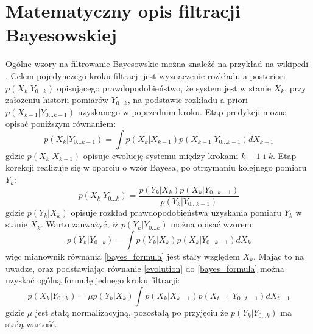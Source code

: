 \section{Matematyczny opis filtracji Bayesowskiej}
Ogólne wzory na filtrowanie Bayesowskie można znaleźć na przykład na wikipedi \cite{wiki_bayes_filter}. Celem pojedynczego kroku filtracji jest wyznaczenie rozkładu a posteriori $p(X_{k}|Y_{0...k})$ opisującego prawdopodobieństwo, że system jest w stanie $X_k$, przy założeniu historii pomiarów $Y_{0...k}$, na podstawie rozkładu a priori $p(X_{k-1}|Y_{0...k-1})$ uzyskanego w poprzednim kroku. Etap predykcji można opisać poniższym równaniem:
\begin{equation} \label{evolution}
	p(X_k|Y_{0...k-1})=\int p(X_k|X_{k-1})p(X_{k-1}|Y_{0...k-1}) dX_{k-1}
\end{equation}
gdzie $p(X_k|X_{k-1})$ opisuje ewolucję systemu między krokami $k-1$ i $k$. Etap korekcji realizuje się w oparciu o wzór Bayesa, po otrzymaniu kolejnego pomiaru $Y_k$:
\begin{equation}\label{bayes_formula}
	p(X_k|Y_{0...k})=\frac{p(Y_k|X_k)p(X_k|Y_{0...k-1})}{p(Y_k|Y_{0...k-1})}
\end{equation}
gdzie $p(Y_k|X_k)$ opisuje rozkład prawdopodobieństwa uzyskania pomiaru $Y_k$ w stanie $X_k$. Warto zauważyć, iż $p(Y_k|Y_{0...k})$ można opisać wzorem:
\begin{equation}
p(Y_k|Y_{0...k})=\int p(Y_k|X_k)p(X_k|Y_{0...k-1}) dX_k
\end{equation}
więc mianownik równania \ref{bayes_formula} jest stały względem $X_k$. Mając to na uwadze, oraz podstawiając równanie \ref{evolution} do \ref{bayes_formula} można uzyskać ogólną formułę jednego kroku filtracji:
\begin{equation}
	p(X_k|Y_{0...k})=\mu p(Y_k|X_k)\int p(X_k|X_{k-1})p(X_{t-1}|Y_{0...t-1}) dX_{t-1}
\end{equation}
gdzie $\mu$ jest stałą normalizacyjną, pozostałą po przyjęciu że $p(Y_k|Y_{0...k})$ ma stałą wartość.
